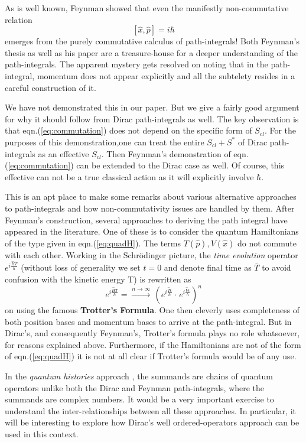 \documentclass[12pt]{article}
\newcommand{\be}{\begin{equation}}
\newcommand{\ee}{\end{equation}}
\begin{document}
As is well known, Feynman showed that even the manifestly non-commutative relation
\be
\label{eq:commutation}
[{\hat x},{\hat p}] = i \hbar
\ee
emerges from the purely commutative calculus of path-integrals!
Both Feynman's thesis \cite{thesis} as well as his paper \cite{feynpaper} are a treasure-house for a
deeper understanding of the path-integrals. The apparent mystery gets resolved on noting that in the path-integral, momentum does not
appear explicitly and all the subtelety resides in a careful construction of it.

We have not demonstrated this in our paper. But we give a fairly good argument for why it should follow from Dirac path-integrals
as well. The key observation is that eqn.(\ref{eq:commutation}) does not depend on the specific form of $S_{cl}$. For the purposes
of this demonstration,one can treat the entire $S_{cl} + S^*$ of Dirac path-integrals as an effective $S_{cl}$. Then Feynman's
demonstration of eqn.(\ref{eq:commutation}) can be extended to the Dirac case as well. Of course, this effective can not be a true
classical action as it will explicitly involve $\hbar$.
 
This is an apt place to make some remarks about various alternative approaches to path-integrals and how non-commutativity issues are
handled by them. After Feynman's construction, several approaches to deriving the path integral have appeared in the literature. One
of these is to consider the quantum Hamiltonians of the type given in eqn.(\ref{eq:quadH}). The terms $T({\hat p}),V({\hat x})$
do not commute with each other. Working in the Schr\"odinger picture, the \emph{time evolution} operator $e^{i\frac{{\hat H}{\bar T}}{\hbar}}$
(without loss of generality we set $t = 0$ and denote final time as ${\bar T}$ to avoid confusion with the kinetic energy T) is rewritten as
\be
\label{eq:slicedTevol}
e^{i\frac{{\hat H}{\bar T}}{\hbar}} = \xrightarrow{n \rightarrow \infty}\,(e^{i \frac{{\hat T}\epsilon}{\hbar}}\cdot\,
e^{i \frac{{\hat V}\epsilon}{\hbar}})^n
\ee
on using the famous {\bf Trotter's Formula}. One then cleverly uses completeness of both position bases and momentum bases to arrive
at the path-integral. But in Dirac's, and consequently Feynman's, Trotter's formula plays no role whatsoever, for reasons explained above. 
Furthermore, if the Hamiltonians
are not of the form of eqn.(\ref{eq:quadH}) it is not at all clear if Trotter's formula would be of any use.

In the \emph{quantum histories} approach \cite{griffiths,histories}, the summands are chains of quantum operators unlike both the Dirac 
and Feynman 
path-integrals, where the summands are complex numbers. It would be a very important exercise to understand the inter-relationships between
all these approaches. In particular, it will be interesting to explore how Dirac's well ordered-operators approach can be used in this context.
\end{document}
